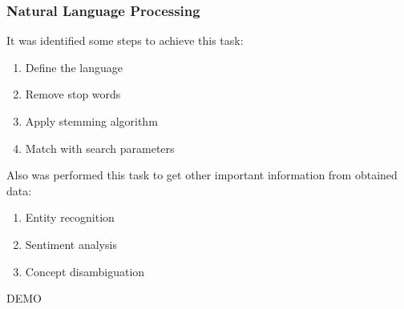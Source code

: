 \documentclass{beamer}
\begin{document}
\begin{frame}
\frametitle{Natural Language Processing}
It was identified some steps to achieve this task:
\begin{enumerate}
\item Define the language
\item Remove stop words
\item Apply stemming algorithm
\item Match with search parameters
\end{enumerate}
Also was performed this task to get other important information from obtained data:
\begin{enumerate}
\item Entity recognition
\item Sentiment analysis
\item Concept disambiguation
\end{enumerate}
\end{frame}

\begin{frame}
\begin{center}
DEMO
\end{center}
\end{frame}
\end{document}
